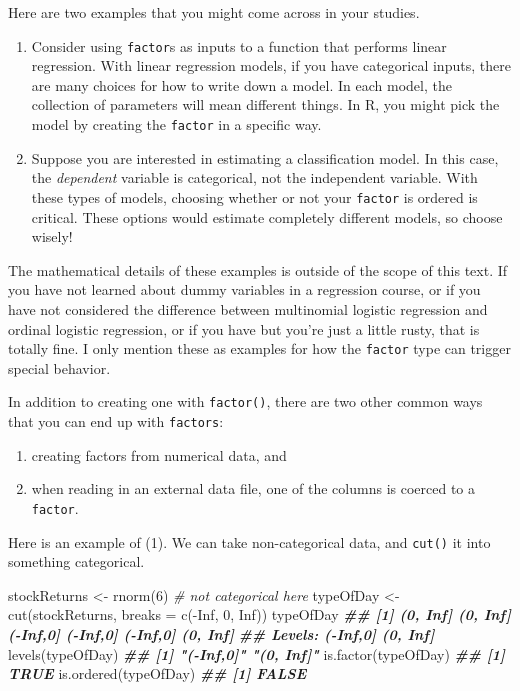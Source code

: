 \documentclass[
  12pt,
  krantz2]{krantz}
\makeatletter
\newenvironment{Shaded}{\begin{snugshade}}{\end{snugshade}}
\newcommand{\AttributeTok}[1]{\textcolor[rgb]{0.61,0.61,0.61}{#1}}
\newcommand{\CommentTok}[1]{\textcolor[rgb]{0.37,0.37,0.37}{\textit{#1}}}
\newcommand{\ConstantTok}[1]{\textcolor[rgb]{0,0,0}{#1}}
\newcommand{\DecValTok}[1]{\textcolor[rgb]{0.06,0.06,0.06}{#1}}
\newcommand{\DocumentationTok}[1]{\textcolor[rgb]{0.37,0.37,0.37}{\textbf{\textit{#1}}}}
\newcommand{\FunctionTok}[1]{\textcolor[rgb]{0,0,0}{#1}}
\newcommand{\NormalTok}[1]{#1}
\newcommand{\OtherTok}[1]{\textcolor[rgb]{0.37,0.37,0.37}{#1}}
\newcommand{\SpecialCharTok}[1]{\textcolor[rgb]{0,0,0}{#1}}
\providecommand{\tightlist}{%
  \setlength{\itemsep}{0pt}\setlength{\parskip}{0pt}}
\newenvironment{kframe}{%
\medskip{}
\setlength{\fboxsep}{.8em}
 \def\at@end@of@kframe{}%
 \ifinner\ifhmode%
  \def\at@end@of@kframe{\end{minipage}}%
  \begin{minipage}{\columnwidth}%
 \fi\fi%
 \def\FrameCommand##1{\hskip\@totalleftmargin \hskip-\fboxsep
 \colorbox{shadecolor}{##1}\hskip-\fboxsep
     \hskip-\linewidth \hskip-\@totalleftmargin \hskip\columnwidth}%
 \MakeFramed {\advance\hsize-\width
   \@totalleftmargin\z@ \linewidth\hsize
   \@setminipage}}%
 {\par\unskip\endMakeFramed%
 \at@end@of@kframe}
\renewenvironment{Shaded}{\begin{kframe}}{\end{kframe}}
\makeatother
\begin{document}
Here are two examples that you might come across in your studies.

\begin{enumerate}
\def\labelenumi{\arabic{enumi}.}
\item
  Consider using \texttt{factor}s as inputs to a function that performs linear regression. With linear regression models, if you have categorical inputs, there are many choices for how to write down a model. In each model, the collection of parameters will mean different things. In R, you might pick the model by creating the \texttt{factor} in a specific way.
\item
  Suppose you are interested in estimating a classification model. In this case, the \emph{dependent} variable is categorical, not the independent variable. With these types of models, choosing whether or not your \texttt{factor} is ordered is critical. These options would estimate completely different models, so choose wisely!
\end{enumerate}

The mathematical details of these examples is outside of the scope of this text. If you have not learned about dummy variables in a regression course, or if you have not considered the difference between multinomial logistic regression and ordinal logistic regression, or if you have but you're just a little rusty, that is totally fine. I only mention these as examples for how the \texttt{factor} type can trigger special behavior.

In addition to creating one with \texttt{factor()}, there are two other common ways that you can end up with \texttt{factors}:

\begin{enumerate}
\def\labelenumi{\arabic{enumi}.}
\tightlist
\item
  creating factors from numerical data, and
\item
  when reading in an external data file, one of the columns is coerced to a \texttt{factor}.
\end{enumerate}

Here is an example of (1). We can take non-categorical data, and \texttt{cut()} it into something categorical.

\begin{Shaded}
\begin{Highlighting}[]
\NormalTok{stockReturns }\OtherTok{\textless{}{-}} \FunctionTok{rnorm}\NormalTok{(}\DecValTok{6}\NormalTok{) }\CommentTok{\# not categorical here}
\NormalTok{typeOfDay }\OtherTok{\textless{}{-}} \FunctionTok{cut}\NormalTok{(stockReturns, }\AttributeTok{breaks =} \FunctionTok{c}\NormalTok{(}\SpecialCharTok{{-}}\ConstantTok{Inf}\NormalTok{, }\DecValTok{0}\NormalTok{, }\ConstantTok{Inf}\NormalTok{)) }
\NormalTok{typeOfDay}
\DocumentationTok{\#\# [1] (0, Inf] (0, Inf] ({-}Inf,0] ({-}Inf,0] ({-}Inf,0] (0, Inf]}
\DocumentationTok{\#\# Levels: ({-}Inf,0] (0, Inf]}
\FunctionTok{levels}\NormalTok{(typeOfDay)}
\DocumentationTok{\#\# [1] "({-}Inf,0]" "(0, Inf]"}
\FunctionTok{is.factor}\NormalTok{(typeOfDay)}
\DocumentationTok{\#\# [1] TRUE}
\FunctionTok{is.ordered}\NormalTok{(typeOfDay)}
\DocumentationTok{\#\# [1] FALSE}
\end{Highlighting}
\end{Shaded}
\end{document}
